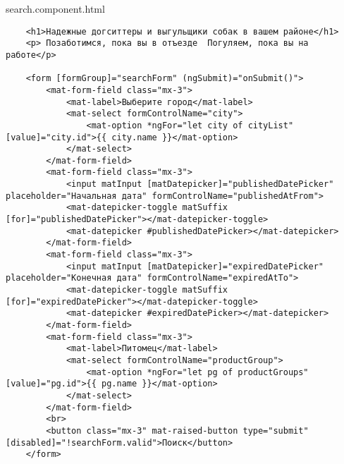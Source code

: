 search.component.html
\begin{lstlisting}
    <h1>Надежные догситтеры и выгульщики собак в вашем районе</h1>
    <p> Позаботимся, пока вы в отъезде  Погуляем, пока вы на работе</p>
    
    <form [formGroup]="searchForm" (ngSubmit)="onSubmit()">
        <mat-form-field class="mx-3">
            <mat-label>Выберите город</mat-label>
            <mat-select formControlName="city">
                <mat-option *ngFor="let city of cityList" [value]="city.id">{{ city.name }}</mat-option>
            </mat-select>
        </mat-form-field>
        <mat-form-field class="mx-3">
            <input matInput [matDatepicker]="publishedDatePicker" placeholder="Начальная дата" formControlName="publishedAtFrom">
            <mat-datepicker-toggle matSuffix [for]="publishedDatePicker"></mat-datepicker-toggle>
            <mat-datepicker #publishedDatePicker></mat-datepicker>
        </mat-form-field>
        <mat-form-field class="mx-3">
            <input matInput [matDatepicker]="expiredDatePicker" placeholder="Конечная дата" formControlName="expiredAtTo">
            <mat-datepicker-toggle matSuffix [for]="expiredDatePicker"></mat-datepicker-toggle>
            <mat-datepicker #expiredDatePicker></mat-datepicker>
        </mat-form-field>
        <mat-form-field class="mx-3">
            <mat-label>Питомец</mat-label>
            <mat-select formControlName="productGroup">
                <mat-option *ngFor="let pg of productGroups" [value]="pg.id">{{ pg.name }}</mat-option>
            </mat-select>
        </mat-form-field>
        <br>
        <button class="mx-3" mat-raised-button type="submit" [disabled]="!searchForm.valid">Поиск</button>
    </form>    
\end{lstlisting}


